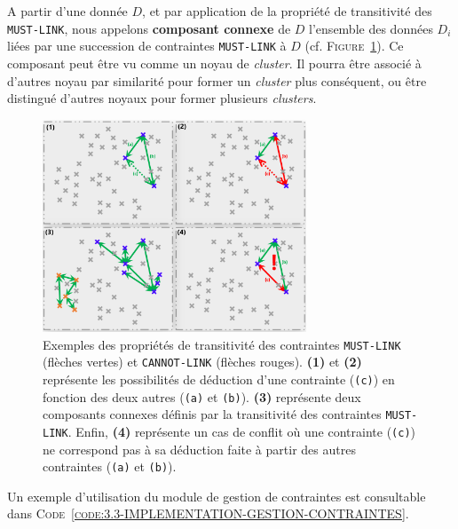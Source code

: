		A partir d'une donnée \(D\), et par application de la propriété de transitivité des \texttt{MUST-LINK}, nous appelons \textbf{composant connexe} de \(D\) l'ensemble des données \(D_i\) liées par une succession de contraintes \texttt{MUST-LINK} à \(D\) (cf. \textsc{Figure~\ref{figure:3.3-CONTRAINTES-TRANSITIVITE}}).
		Ce composant peut être vu comme un noyau de \textit{cluster}.
		Il pourra être associé à d'autres noyau par similarité pour former un \textit{cluster} plus conséquent, ou être distingué d'autres noyaux pour former plusieurs \textit{clusters}.

		\begin{figure}[!htb]
			\centering
			\includegraphics[width=0.70\textwidth]{figures/example-constraints-transitivity}
			\caption{
				Exemples des propriétés de transitivité des contraintes \texttt{MUST-LINK} (flèches vertes) et \texttt{CANNOT-LINK} (flèches rouges). \textbf{(1)} et \textbf{(2)} représente les possibilités de déduction d'une contrainte (\texttt{(c)}) en fonction des deux autres (\texttt{(a)} et \texttt{(b)}). \textbf{(3)} représente deux composants connexes définis par la transitivité des contraintes \texttt{MUST-LINK}. Enfin, \textbf{(4)} représente un cas de conflit où une contrainte (\texttt{(c)}) ne correspond pas à sa déduction faite à partir des autres contraintes (\texttt{(a)} et \texttt{(b)}).
			}
			\label{figure:3.3-CONTRAINTES-TRANSITIVITE}
		\end{figure}
		
		Un exemple d'utilisation du module de gestion de contraintes est consultable dans \textsc{Code~\ref{code:3.3-IMPLEMENTATION-GESTION-CONTRAINTES}}.
		
